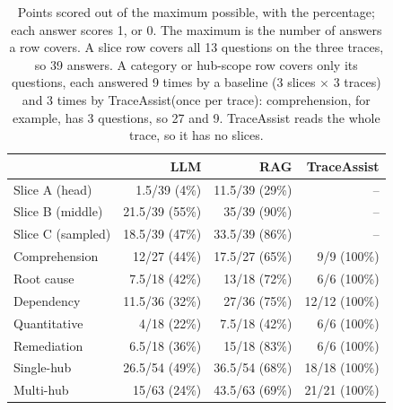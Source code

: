 \documentclass[10pt,conference]{IEEEtran}
\newcommand{\sysname}{TraceAssist\xspace}
\begin{document}
\begin{table}[t]
\centering
\caption{Points scored out of the maximum possible, with the percentage; each answer scores 1, \textonehalf{} or 0. The maximum is the number of answers a row covers. A slice row covers all 13 questions on the three traces, so 39 answers. A category or hub-scope row covers only its questions, each answered 9 times by a baseline (3 slices $\times$ 3 traces) and 3 times by \sysname (once per trace): comprehension, for example, has 3 questions, so 27 and 9. \sysname reads the whole trace, so it has no slices.}
\label{tab:breakdown}
\footnotesize
\setlength{\tabcolsep}{2pt}
\begin{tabular}{@{}lrrr@{}}
\toprule
 & LLM & RAG & \sysname \\
\midrule
Slice A (head)   & 1.5/39 (4\%)   & 11.5/39 (29\%) & -- \\
Slice B (middle) & 21.5/39 (55\%) & 35/39 (90\%)   & -- \\
Slice C (sampled)& 18.5/39 (47\%) & 33.5/39 (86\%) & -- \\
\midrule
Comprehension         & 12/27 (44\%)   & 17.5/27 (65\%) & 9/9 (100\%) \\
Root cause            & 7.5/18 (42\%)  & 13/18 (72\%)   & 6/6 (100\%) \\
Dependency            & 11.5/36 (32\%) & 27/36 (75\%)   & 12/12 (100\%) \\
Quantitative          & 4/18 (22\%)    & 7.5/18 (42\%)  & 6/6 (100\%) \\
Remediation           & 6.5/18 (36\%)  & 15/18 (83\%)   & 6/6 (100\%) \\
\midrule
Single-hub            & 26.5/54 (49\%) & 36.5/54 (68\%) & 18/18 (100\%) \\
Multi-hub             & 15/63 (24\%)   & 43.5/63 (69\%) & 21/21 (100\%) \\
\bottomrule
\end{tabular}
\end{table}


\end{document}
